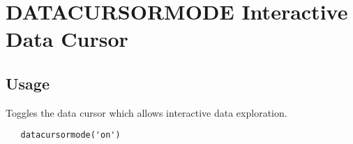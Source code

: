 \section{DATACURSORMODE Interactive Data Cursor}

\subsection{Usage}

Toggles the data cursor which allows interactive data exploration. 
\begin{verbatim}
   datacursormode('on')
\end{verbatim}
